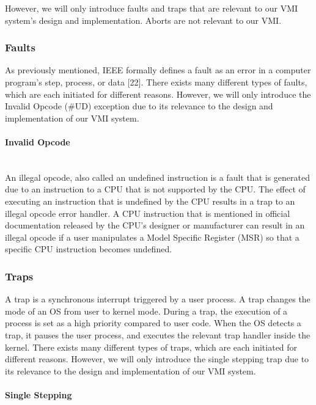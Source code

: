 \documentclass{report}
\begin{document}
\begin{spacing}{1.5}
{However, we will only introduce faults and traps that are relevant to our VMI system's design and implementation. Aborts are not relevant to our VMI.
\newline
}

\subsubsection{Faults}
{\large
As previously mentioned, IEEE formally defines a fault as an error in a computer program's step, process, or data [22]. There exists many different types of faults, which are each initiated for different reasons. However, we will only introduce the Invalid Opcode (\#UD) exception due to its  relevance to the design and implementation of our VMI system.  
\newline
}

\paragraph{Invalid Opcode}\mbox{}\\

{\large
An illegal opcode, also called an undefined instruction is a fault that is generated due to an instruction to a CPU that is not supported by the CPU. The effect of executing an instruction that is undefined by the CPU results in a trap to an illegal opcode error handler. A CPU instruction that is mentioned in official documentation released by the CPU’s designer or manufacturer can result in an illegal opcode if a user manipulates a Model Specific Register (MSR) so that a specific CPU instruction becomes undefined. 
\newline
}


\subsubsection{Traps}
A trap is a synchronous interrupt triggered by a user process. A trap changes the mode of an OS from user to kernel mode. During a trap, the execution of a process is set as a high priority compared to user code. When the OS detects a trap, it pauses the user process, and executes the relevant trap handler inside the kernel. There exists many different types of traps, which are each initiated for different reasons. However, we will only introduce the single stepping trap due to its relevance to the design and implementation of our VMI system.  

\paragraph{Single Stepping}\mbox{}\\


\end{spacing}
\end{document}
